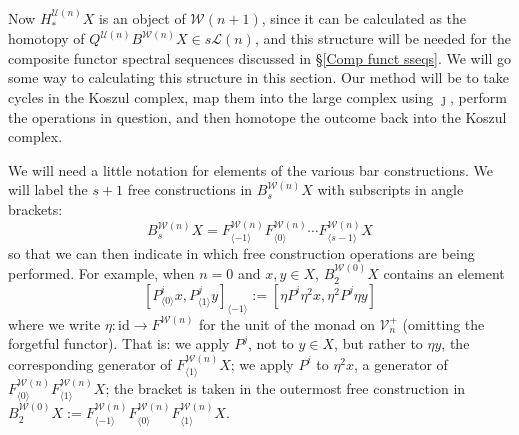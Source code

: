 \documentclass[11pt]{amsart} \renewcommand{\baselinestretch}{1.2}
\theoremstyle{plain}
\numberwithin{equation}{section} %
\theoremstyle{plain}
\numberwithin{equation}{chapter} %
\renewcommand{\to}{\longrightarrow}
\newcommand{\calU}{\mathcal{U}}
\newcommand{\calL}{\mathcal{L}}
\newcommand{\calV}{\mathcal{V}}
\newcommand{\calw}{\mathcal{W}}
\newcommand{\vect}[2]{\calV^{#1}_{#2}}
\newcommand{\Id}{\mathrm{id}}
\begin{document}
\begin{Koszul complexes}
Now $H^{\calU(n)}_*X$ is an object of $\calw(n+1)$, since it can be calculated as the homotopy of $Q^{\calU(n)}B^{\calw(n)}X\in s\calL(n)$, and this  structure will be needed for the composite functor spectral sequences discussed in \S\ref{Comp funct sseqs}. We will go some way to calculating this structure in this section. Our method will be to take cycles in the Koszul complex, map them into the large complex using $\jmath$, perform the operations in question, and then homotope the outcome back into the Koszul complex.

We will need a little notation for elements of the various bar constructions. We will label the $s+1$ free constructions in $B^{\calw(n)}_{s}X$ with subscripts in angle brackets: 
\[B^{\calw(n)}_{s}X= F^{\calw(n)}_{\langle -1\rangle}F^{\calw(n)}_{\langle 0\rangle}\cdots F^{\calw(n)}_{\langle s-1\rangle}X\]%
so that we can then indicate in which free construction operations are being performed. For example, when $n=0$ and $x,y\in X$, $B_2^{\calw(0)}X$ contains an element
\[[P^i_{\langle 0\rangle}x,P^j_{\langle 1\rangle}y]_{\langle -1\rangle}:=[\eta P^i\eta^2 x,\eta^2P^j\eta y]\]%
where we write $\eta:\Id\to F^{\calw(n)}$ for the unit of the monad on $\vect{+}{n}$ (omitting the forgetful functor). That is: we apply $P^j$, not to $y\in X$, but rather to $\eta y$, the corresponding generator of $F^{\calw(n)}_{\langle 1\rangle}X$; we  apply $P^i$ to $\eta^2 x$, a generator of $F^{\calw(n)}_{\langle 0\rangle}F^{\calw(n)}_{\langle 1\rangle}X$; the bracket is taken in the outermost free construction in $B_2^{\calw(0)}X:=F^{\calw(n)}_{\langle -1\rangle}F^{\calw(n)}_{\langle 0\rangle}F^{\calw(n)}_{\langle 1\rangle}X$.%


\end{Koszul complexes}
\end{document}
